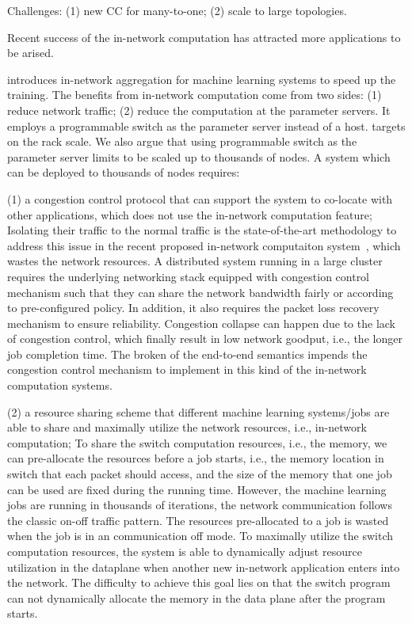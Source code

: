 Challenges: (1) new CC for many-to-one; (2) scale to large topologies.



Recent success of the in-network computation has attracted more 
applications to be arised.  

\switchml introduces in-network aggregation for machine learning systems
to speed up the training. The benefits from in-network computation 
come from two sides: (1) reduce network traffic; (2) reduce the computation
at the parameter servers. 
It employs a programmable switch as the parameter server instead of a host. 
\switchml targets on the rack scale. We also argue that using programmable switch
as the parameter server limits \switchml to be scaled up to 
thousands of nodes. A system which can be deployed to thousands of nodes requires:


(1) a congestion control protocol that can support the system to
co-locate with other applications, which does not use the in-network computation feature;
Isolating their traffic to the normal traffic is the state-of-the-art methodology to 
address this issue in the recent proposed in-network computaiton system~\cite{netcache, netchain, harmonia, switchml}, which wastes the network resources. 
A distributed system running in a large cluster requires the underlying networking stack equipped with 
congestion control mechanism such that they can share the network
bandwidth fairly or according to pre-configured policy.
In addition, it also requires the packet loss recovery mechanism to ensure 
reliability. Congestion collapse can happen due to the lack of congestion control, 
which finally result in low network goodput, i.e., the longer job completion time. 
The broken of the end-to-end semantics impends the congestion control mechanism to implement
in this kind of the in-network computation systems. 


(2) a resource sharing scheme that different machine learning systems/jobs
are able to share and maximally utilize the network resources, i.e., in-network computation;
To share the switch computation resources, i.e., the memory, we can pre-allocate 
the resources before a job starts, i.e., 
the memory location in switch that each packet should access, and the
size of the memory that one job can be used are fixed during the running time.
However, the machine learning jobs are running in thousands of iterations, 
the network communication
follows the classic on-off traffic pattern. The resources pre-allocated to 
a job is wasted when the job is in an communication off mode.
To maximally utilize the switch computation resources, 
the system is able to dynamically adjust resource utilization in
the dataplane when another new in-network application enters into the network.
The difficulty to achieve this goal lies on that the switch program can not dynamically 
allocate the memory in the data plane after the program starts.


